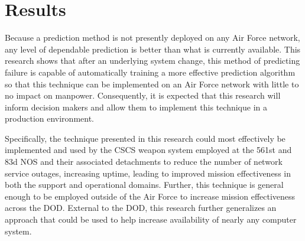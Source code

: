 \section{Results}
Because a prediction method is not presently deployed on any Air Force network,
any level of dependable prediction is better than what is currently
available.  This research shows that after an underlying system change, this
method of predicting failure is capable of automatically training a more
effective prediction algorithm so that this technique can be implemented on an
Air Force network with little to no impact on manpower.  Consequently, it is
expected that this research will inform decision makers and allow them to
implement this technique in a production environment.

Specifically, the technique presented in this research could most effectively
be implemented and used by the \ac{CSCS} weapon system employed at the 561st
and 83d \ac{NOS} and their associated detachments to reduce the number of
network service outages, increasing uptime, leading to improved mission
effectiveness in both the support and operational domains.  Further, this
technique is general enough to be employed outside of the Air Force to increase
mission effectiveness across the \ac{DOD}.  External to the \ac{DOD}, this
research further generalizes an approach that could be used to help increase
availability of nearly any computer system.
